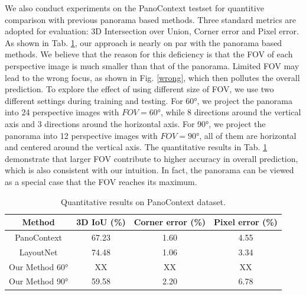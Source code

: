We also conduct experiments on the PanoContext testset for quantitive comparison with previous panorama based methods. Three standard metrics are adopted for evaluation: 3D Intersection over Union, Corner error and Pixel error. As shown in Tab. \ref{tab:PC}, our approach is nearly on par with the panorama based methods. We believe that the reason for this deficiency is that the FOV of each perspective image is much smaller than that of the panorama. Limited FOV may lead to the wrong focus, as shown in Fig. \ref{wrong}, which then pollutes the overall prediction. To explore the effect of using different size of FOV, we use two different settings during training and testing. For \ang{60}, we project the panorama into 24 perspective images with $FOV=\ang{60}$, while 8 directions around the vertical axis and 3 directions around the horizontal axis. For \ang{90}, we project the panorama into 12 perspective images with $FOV=\ang{90}$, all of them are horizontal and centered around the vertical axis. The quantitative results in Tab. \ref{tab:PC} demonstrate that larger FOV contribute to higher accuracy in overall prediction, which is also consistent with our intuition. In fact, the panorama can be viewed as a special case that the FOV reaches its maximum.






\begin{table}
	\caption{Quantitative results on PanoContext dataset.}
	\label{tab:PC}
	\begin{tabular}{cccc}
		\toprule
		Method&3D IoU (\%)&Corner error (\%)&Pixel error (\%)\\
		\midrule
		PanoContext & 67.23 & 1.60 & 4.55\\
		LayoutNet & 74.48 & 1.06 & 3.34\\
		Our Method \ang{60} & XX & XX & XX\\	
		Our Method \ang{90} & 59.58 & 2.20 & 6.78\\		
		\bottomrule
	\end{tabular}
\end{table}

